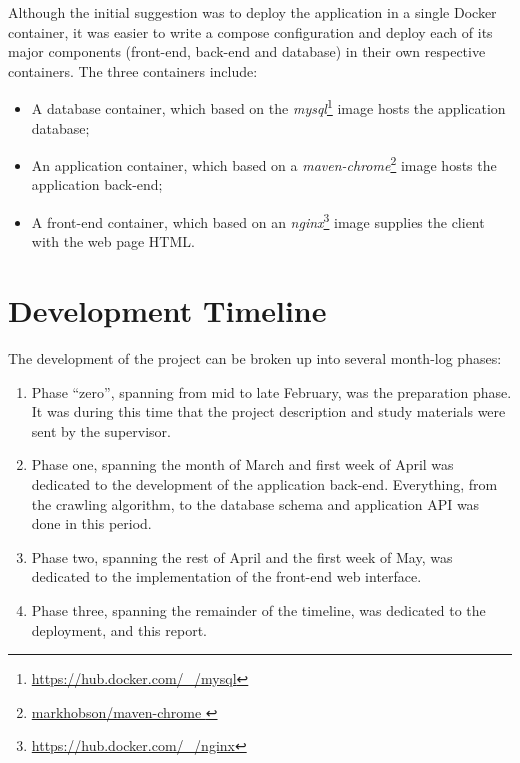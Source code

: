 Although the initial suggestion was to deploy the application in a single Docker container, it was easier to write a compose configuration and deploy each of its major components (front-end, back-end and database) in their own respective containers. The three containers include:
\begin{itemize}
    \item A database container, which based on the \textit{mysql}\footnote{\url{https://hub.docker.com/_/mysql}} image hosts the application database;
    \item An application container, which based on a \textit{maven-chrome}\footnote{\url{markhobson/maven-chrome
    }} image hosts the application back-end;
    \item A front-end container, which based on an \textit{nginx}\footnote{\url{https://hub.docker.com/_/nginx}} image supplies the client with the web page HTML\@.
\end{itemize}

\newpage
\section{Development Timeline}

The development of the project can be broken up into several month-log phases:
\begin{enumerate}
    \item Phase ``zero'', spanning from mid to late February, was the preparation phase. It was during this time that the project description and study materials were sent by the supervisor.
    \item Phase one, spanning the month of March and first week of April was dedicated to the development of the application back-end. Everything, from the crawling algorithm, to the database schema and application API was done in this period.
    \item Phase two, spanning the rest of April and the first week of May, was dedicated to the implementation of the front-end web interface.
    \item Phase three, spanning the remainder of the timeline, was dedicated to the deployment, and this report.
\end{enumerate}